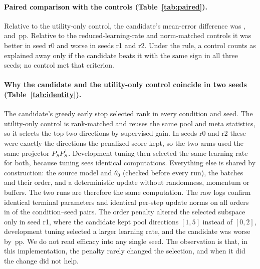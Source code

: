 

\paragraph{Paired comparison with the controls (Table~\ref{tab:paired}).} Relative to the utility-only
control, the candidate's mean-error difference was ,
 and \,pp. Relative to the
reduced-learning-rate and norm-matched controls it was better in seed r0 and worse in seeds r1 and r2. Under
the rule, a control counts as explained away only if the candidate beats it with the same sign in all three
seeds; no control met that criterion.



\paragraph{Why the candidate and the utility-only control coincide in two seeds (Table~\ref{tab:identity}).}
The candidate's greedy early stop selected rank  in every condition and seed. The utility-only
control is rank-matched and reuses the same pool and meta statistics, so it selects the top two directions by
supervised gain. In seeds r0 and r2 these were exactly the directions the penalized score kept, so the two
arms used the same projector $P_SP_S^\top$. Development tuning then selected the same learning rate for
both, because tuning sees identical computations. Everything else is shared by construction: the source
model and $\theta_0$ (checked before every run), the batches and their order, and a deterministic update
without randomness, momentum or buffers. The two runs are therefore the same computation. The raw logs confirm
identical terminal parameters and identical per-step update norms on all orders in  of the
 condition--seed pairs. The order penalty altered the selected subspace only in seed r1,
where the candidate kept pool directions $[1,5]$ instead of $[0,2]$, development tuning selected a larger
learning rate, and the candidate was worse by \,pp. We do not read efficacy
into any single seed. The observation is that, in this implementation, the penalty rarely changed the
selection, and when it did the change did not help.



